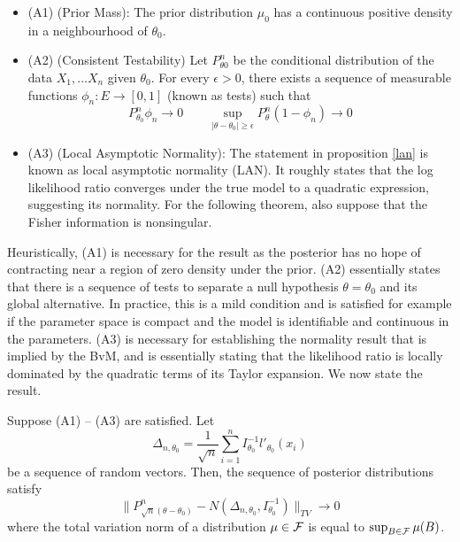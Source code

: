 \begin{itemize}
	\item (A1) (Prior Mass): The prior distribution $\mu_0$ has a continuous positive density in a neighbourhood of $\theta_0$.
	\item (A2) (Consistent Testability) Let $P^n_{\theta0}$ be the conditional distribution of the data $X_1, \dots X_n$ given $\theta_0$. For every $\epsilon > 0$, there exists a sequence of measurable functions $\phi_n : E \to [0,1]$ (known as tests) such that 
	\begin{equation}
	P^n_{\theta_0} \phi_n \to 0 \quad \quad \sup_{|\theta - \theta_0|\geq \epsilon} P^n_{\theta}(1-\phi_n) \to 0
	\end{equation}
	\item (A3) (Local Asymptotic Normality): The statement in proposition \ref{lan} is known as local asymptotic normality (LAN). It roughly states that the log likelihood ratio converges under the true model to a quadratic expression, suggesting its normality. For the following theorem, also suppose that the Fisher information is nonsingular.
\end{itemize}

	Heuristically, (A1) is necessary for the result as the posterior has no hope of contracting near a region of zero density under the prior. (A2) essentially states that there is a sequence of tests to separate a null hypothesis $\theta = \theta_0$ and its global alternative. In practice, this is a mild condition and is satisfied for example if the parameter space is compact and the model is identifiable and continuous in the parameters. (A3) is necessary for establishing the normality result that is implied by the BvM, and is essentially stating that the likelihood ratio is locally dominated by the quadratic terms of its Taylor expansion. We now state the result. 

\begin{theorem}
	\label{bvm}
	Suppose (A1) -- (A3) are satisfied. Let
	\begin{equation}
		\Delta_{n, \theta_0} = \frac{1}{\sqrt{n}}\sum_{i=1}^n I_{\theta_0}^{-1} l'_{\theta_0}(x_i)
	\end{equation}
	be a sequence of random vectors. Then, the sequence of posterior distributions satisfy 
	\begin{equation*}
	\|P^n_{\sqrt{n}(\theta - \theta_0)} - N(\Delta_{n, \theta_0}, I^{-1}_{\theta_0})\|_{TV} \to 0
	\end{equation*}
	where the total variation norm of a distribution $\mu \in \mathcal{F}$ is equal to $\sup_{B\in \mathcal{F}} \mu(B)$. 
\end{theorem} 
